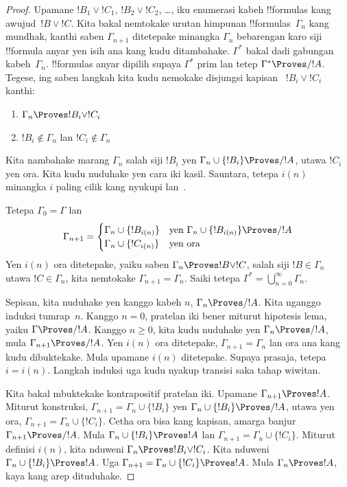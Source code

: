 \documentclass[../../../include/open-logic-section]{subfiles}
\begin{document}
\begin{proof}
  Upamane $!B_1 \lor !C_1$, $!B_2 \lor !C_2$, \dots, iku enumerasi
  kabeh !!{formula}s kang awujud~$!B \lor !C$. Kita bakal nemtokake
  urutan himpunan !!{formula}s~$\Gamma_n$ kang mundhak, kanthi saben
  $\Gamma_{n+1}$ ditetepake minangka $\Gamma_n$ bebarengan karo siji
  !!{formula} anyar yen isih ana kang kudu ditambahake. $\Gamma^*$
  bakal dadi gabungan kabeh~$\Gamma_n$. !!{formula}s anyar dipilih
  supaya $\Gamma^*$ prim lan tetep $\Gamma^* \Proves/ !A$.
  Tegese, ing saben langkah kita kudu nemokake disjungsi kapisan
  ~$!B_i \lor !C_i$ kanthi:
  \begin{enumerate}
  \item{} $\Gamma_n \Proves !B_i \lor !C_i$
  \item{} $!B_i \notin \Gamma_n$ lan $!C_i \notin \Gamma_n$
  \end{enumerate}
  Kita nambahake marang $\Gamma_n$ salah siji $!B_i$ yen
  $\Gamma_n \cup \{!B_i\} \Proves/ !A$, utawa $!C_i$ yen ora.
  Kita kudu nuduhake yen cara iki kasil. Sauntara, tetepa $i(n)$
  minangka $i$ paling cilik kang nyukupi 
  lan~.
  
  Tetepa $\Gamma_0 = \Gamma$ lan
  \[
  \Gamma_{n+1} = \begin{cases}
    \Gamma_n \cup \{!B_{i(n)}\} &
    \text{yen $\Gamma_n \cup \{!B_{i(n)}\} \Proves/ !A$} \\
    \Gamma_n \cup \{!C_{i(n)}\} & \text{yen ora}
    \end{cases}
  \]
  Yen $i(n)$ ora ditetepake, yaiku saben $\Gamma_n \Proves !B \lor !C$,
  salah siji $!B \in \Gamma_n$ utawa $!C \in \Gamma_n$, kita nemtokake
  $\Gamma_{n+1} = \Gamma_n$. Saiki tetepa
  $\Gamma^* = \bigcup_{n=0}^\infty \Gamma_n$.

  Sepisan, kita nuduhake yen kanggo kabeh $n$, $\Gamma_n \Proves/ !A$.
  Kita nganggo induksi tumrap~$n$. Kanggo $n = 0$, pratelan iki
  bener miturut hipotesis lema, yaiku $\Gamma \Proves/ !A$.
  Kanggo $n \ge 0$, kita kudu nuduhake yen $\Gamma_n \Proves/ !A$,
  mula $\Gamma_{n+1} \Proves/ !A$. Yen $i(n)$ ora ditetepake,
  $\Gamma_{n+1} = \Gamma_n$ lan ora ana kang kudu dibuktekake.
  Mula upamane $i(n)$ ditetepake. Supaya prasaja, tetepa $i = i(n)$.
Langkah induksi uga kudu nyakup transisi saka tahap wiwitan.
  
  Kita bakal mbuktekake kontrapositif pratelan iki. Upamane
  $\Gamma_{n+1} \Proves !A$. Miturut konstruksi,
  $\Gamma_{n+1} = \Gamma_n \cup \{!B_i\}$ yen
  $\Gamma_n \cup \{!B_i\} \Proves/ !A$, utawa yen ora,
  $\Gamma_{n+1} = \Gamma_n \cup \{!C_i\}$. Cetha ora bisa kang
  kapisan, amarga banjur $\Gamma_{n+1} \Proves/ !A$. Mula
  $\Gamma_n \cup \{!B_i\} \Proves !A$ lan
  $\Gamma_{n+1} = \Gamma_n \cup \{!C_i\}$. Miturut definisi $i(n)$,
  kita nduweni $\Gamma _n \Proves !B_i \lor !C_i$.
  Kita nduweni $\Gamma_n \cup \{!B_i\} \Proves !A$. Uga
  $\Gamma_{n+1} = \Gamma_n \cup \{!C_i\} \Proves !A$.
  Mula $\Gamma_n \Proves !A$, kaya kang arep dituduhake.


\end{proof}
\end{document}

